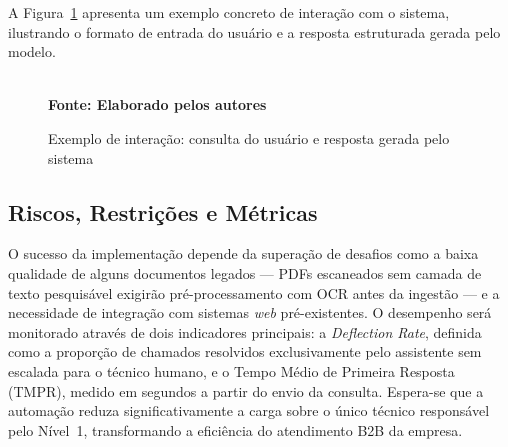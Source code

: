 \documentclass[a4paper,12pt,Times]{article}
\begin{document}
A Figura~\ref{fig:io} apresenta um exemplo concreto de interação com o sistema, ilustrando
o formato de entrada do usuário e a resposta estruturada gerada pelo modelo.

\begin{figure}[ht]
  \centering
  \caption[\hspace{0.1cm}Exemplo de input/output do assistente RAG.]{Exemplo de interação: consulta do usuário e resposta gerada pelo sistema}
  \vspace{0.4cm}
  \vspace{0.2cm}
  \\\textbf{\footnotesize Fonte: Elaborado pelos autores}
  \label{fig:io}
\end{figure}

\subsection{Riscos, Restrições e Métricas}

O sucesso da implementação depende da superação de desafios como a baixa qualidade de
alguns documentos legados — PDFs escaneados sem camada de texto pesquisável exigirão
pré-processamento com OCR antes da ingestão — e a necessidade de integração com sistemas
\textit{web} pré-existentes. O desempenho será monitorado através de dois indicadores
principais: a \textit{Deflection Rate}, definida como a proporção de chamados resolvidos
exclusivamente pelo assistente sem escalada para o técnico humano, e o Tempo Médio de
Primeira Resposta (TMPR), medido em segundos a partir do envio da consulta. Espera-se
que a automação reduza significativamente a carga sobre o único técnico responsável pelo
Nível~1, transformando a eficiência do atendimento B2B da empresa.
\end{document}
